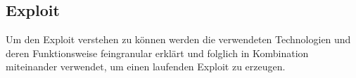
\subsection{Exploit}\label{subsec:exploit}
Um den Exploit verstehen zu können werden die verwendeten Technologien und deren Funktionsweise
feingranular erklärt und folglich in Kombination miteinander verwendet, um einen laufenden Exploit zu erzeugen.

